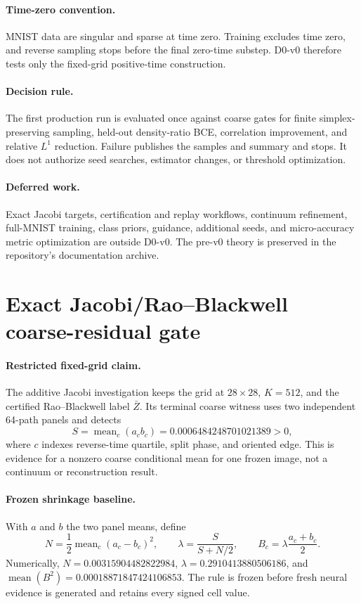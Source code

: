 \documentclass[11pt]{article}
\begin{document}
\paragraph{Time-zero convention.}
MNIST data are singular and sparse at time zero. Training excludes time zero,
and reverse sampling stops before the final zero-time substep. D0-v0 therefore
tests only the fixed-grid positive-time construction.

\paragraph{Decision rule.}
The first production run is evaluated once against coarse gates for finite
simplex-preserving sampling, held-out density-ratio BCE, correlation
improvement, and relative $L^1$ reduction. Failure publishes the samples and
summary and stops. It does not authorize seed searches, estimator changes, or
threshold optimization.

\paragraph{Deferred work.}
Exact Jacobi targets, certification and replay workflows, continuum
refinement, full-MNIST training, class priors, guidance, additional seeds, and
micro-accuracy metric optimization are outside D0-v0. The pre-v0 theory is
preserved in the repository's documentation archive.

\section{Exact Jacobi/Rao--Blackwell coarse-residual gate}

\paragraph{Restricted fixed-grid claim.}
The additive Jacobi investigation keeps the grid at $28\times28$,
$K=512$, and the certified Rao--Blackwell label $\bar Z$. Its terminal
coarse witness uses two independent 64-path panels and detects
\[
  S=\operatorname{mean}_{c}(a_cb_c)
   =0.0006484248701021389>0,
\]
where $c$ indexes reverse-time quartile, split phase, and oriented edge.
This is evidence for a nonzero coarse conditional mean for one frozen image,
not a continuum or reconstruction result.

\paragraph{Frozen shrinkage baseline.}
With $a$ and $b$ the two panel means, define
\[
  N=\frac12\operatorname{mean}_{c}(a_c-b_c)^2,\qquad
  \lambda=\frac{S}{S+N/2},\qquad
  B_c=\lambda\frac{a_c+b_c}{2}.
\]
Numerically, $N=0.00315904482822984$,
$\lambda=0.2910413880506186$, and
$\operatorname{mean}(B^2)=0.00018871847424106853$. The rule is frozen
before fresh neural evidence is generated and retains every signed cell
value.
\end{document}
